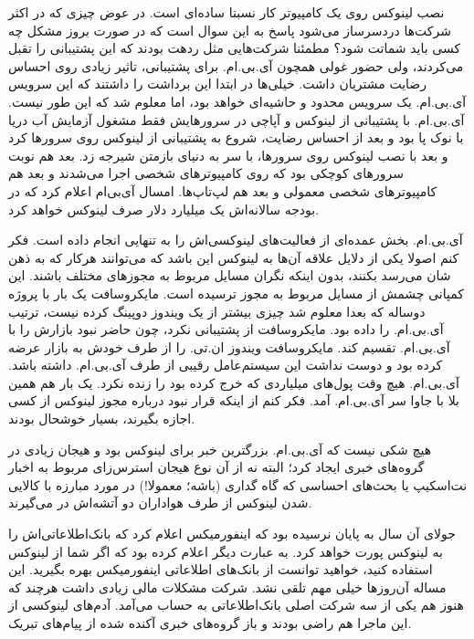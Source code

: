 نصب لینوکس روی یک کامپیوتر کار نسبتا ساده‌ای است. در عوض چیزی که در
اکثر شرکت‌ها دردسرساز می‌شود پاسخ به این سوال است که در صورت بروز مشکل
چه کسی باید شماتت شود؟ مطمئنا شرکت‌هایی مثل ردهت بودند که این پشتیبانی
را تقبل می‌کردند، ولی حضور غولی همچون آی.بی.ام. برای پشتیبانی، تاثیر
زیادی روی احساس رضایت مشتریان داشت. خیلی‌ها در ابتدا این برداشت را
داشتند که این سرویس آی.بی.ام. یک سرویس محدود و حاشیه‌ای خواهد بود، اما
معلوم شد که این طور نیست. آی.بی.ام. با پشتیبانی از لینوکس و آپاچی در
سرورهایش فقط مشغول آزمایش آب دریا با نوک پا بود و بعد از احساس رضایت،
شروع به پشتیبانی از لینوکس روی سرورها کرد و بعد با نصب لینوکس روی
سرورها، با سر به دنیای بازمتن شیرجه زد. بعد هم نوبت سرورهای کوچکی بود
که روی کامپیوترهای شخصی اجرا می‌شدند و بعد هم کامپیوترهای شخصی معمولی و
بعد هم لپ‌تاپ‌ها. امسال آی‌بی‌ام اعلام کرد که در بودجه سالانه‌اش یک میلیارد
دلار صرف لینوکس خواهد کرد.

آی.بی.ام. بخش عمده‌ای از فعالیت‌های لینوکسی‌اش را به تنهایی انجام داده
است. فکر کنم اصولا یکی از دلایل علاقه آن‌ها به لینوکس این باشد که
می‌توانند هرکار که به ذهن شان می‌رسد بکنند، بدون اینکه نگران مسایل مربوط
به مجوزهای مختلف باشند. این کمپانی چشمش از مسایل مربوط به مجوز ترسیده
است. مایکروسافت یک بار با پروژه دوساله  که بعدا معلوم شد چیزی
بیشتر از یک ویندوز دوپینگ کرده نیست، ترتیب آی.بی.ام. را داده
بود. مایکروسافت از  پشتیبانی نکرد، چون حاضر نبود بازارش را با
آی.بی.ام. تقسیم کند. مایکروسافت ویندوز ان.تی. را از طرف خودش به بازار
عرضه کرده بود و دوست نداشت این سیستم‌عامل رقیبی از طرف آی.بی.ام. داشته
باشد. آی.بی.ام. هیچ وقت پول‌های میلیاردی که خرج  کرده بود را
زنده نکرد. یک بار هم همین بلا با جاوا سر آی.بی.ام. آمد. فکر کنم از
اینکه قرار نبود درباره مجوز لینوکس از کسی اجازه بگیرند، بسیار خوشحال
بودند.

هیچ شکی نیست که آی.بی.ام. بزرگترین خبر برای لینوکس بود و هیجان زیادی
در گروه‌های خبری ایجاد کرد؛ البته نه از آن نوع هیجان استرس‌زای مربوط به
اخبار نت‌اسکیپ یا بحث‌های احساسی که گاه گداری (باشه؛ معمولا!) در مورد
مبارزه با کالایی شدن لینوکس از طرف هواداران دو آتشه‌اش در می‌گیرند.

جولای آن سال به پایان نرسیده بود که اینفورمیکس
اعلام کرد که بانک‌اطلاعاتی‌اش را به لینوکس پورت خواهد کرد. به عبارت دیگر
اعلام کرده بود که اگر شما از لینوکس استفاده کنید، خواهید توانست از
بانک‌های اطلاعاتی اینفورمیکس بهره بگیرید. این مساله آن‌روزها خیلی مهم
تلقی نشد. شرکت مشکلات مالی زیادی داشت هرچند که هنوز هم یکی از سه شرکت
اصلی بانک‌اطلاعاتی به حساب می‌آمد. آدم‌های لینوکسی از این ماجرا هم راضی
بودند و باز گروه‌های خبری آکنده شده از پیام‌های تبریک.

